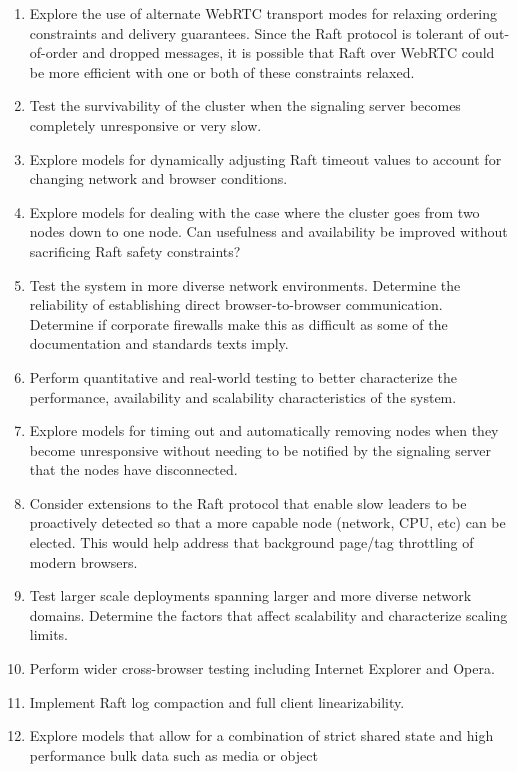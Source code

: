 \documentclass[9pt]{extarticle}
\begin{document}
\begin{multicols}{2}
\begin{enumerate}
\item Explore the use of alternate WebRTC transport modes for relaxing
    ordering constraints and delivery guarantees. Since the Raft
    protocol is tolerant of out-of-order and dropped messages, it is
    possible that Raft over WebRTC could be more efficient with one or
    both of these constraints relaxed.
\item Test the survivability of the cluster when the signaling server
    becomes completely unresponsive or very slow.
\item Explore models for dynamically adjusting Raft timeout values to
    account for changing network and browser conditions.
\item Explore models for dealing with the case where the cluster goes
    from two nodes down to one node. Can usefulness and availability
    be improved without sacrificing Raft safety constraints?
\item Test the system in more diverse network environments. Determine
    the reliability of establishing direct browser-to-browser
    communication.  Determine if corporate firewalls make this as
    difficult as some of the documentation and standards texts imply. %
\item Perform quantitative and real-world testing to better
    characterize the performance, availability and scalability
    characteristics of the system.
\item Explore models for timing out and automatically removing nodes
    when they become unresponsive without needing to be notified by
    the signaling server that the nodes have disconnected.
\item Consider extensions to the Raft protocol that enable slow
    leaders to be proactively detected so that a more capable node
    (network, CPU, etc) can be elected. This would help address that
    background page/tag throttling of modern browsers.
\item Test larger scale deployments spanning larger and more diverse
    network domains. Determine the factors that affect scalability and
    characterize scaling limits.
\item Perform wider cross-browser testing including Internet Explorer
    and Opera.
\item Implement Raft log compaction and full client linearizability.
\item Explore models that allow for a combination of strict shared
    state and high performance bulk data such as media or object

\end{enumerate}
\end{multicols}
\end{document}
